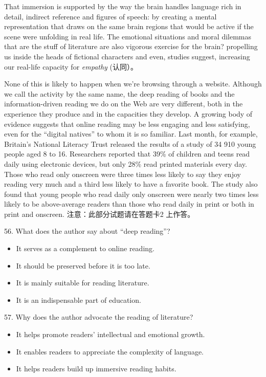 \documentclass[UTF8,11pt]{ctexart}
\begin{document}
That immersion is supported by the way the brain handles language rich in detail, indirect reference and figures of speech: by creating a mental representation that draws on the same brain regions that would be active if the scene were unfolding in real life. The emotional situations and moral dilemmas that are the stuff of literature are also vigorous exercise for the brain? propelling us inside the heads of fictional characters and even, studies suggest, increasing our real-life capacity for\textit{ empathy} (认同）。


None of this is likely to happen when we’re browsing through a website. Although we call the activity by the same name, the deep reading of books and the information-driven reading we do on the Web are very different, both in the experience they produce and in the capacities they develop. A growing body of evidence suggests that online reading may be less engaging and less satisfying, even for the “digital natives” to whom it is so familiar. Last month, for example, Britain’s National Literacy Trust released the results of a study of 34 910 young people aged 8 to 16. Researchers reported that 39\% of children and teens read daily using electronic devices, but only 28\% read printed materials every day. Those who read only onscreen were three times less likely to say they enjoy reading very much and a third less likely to have a favorite book. The study also found that young people who read daily only onscreen were nearly two times less likely to be above-average readers than those who read daily in print or both in print and onscreen. 注意：此部分试题请在答题卡2 上作答。


56. What does the author say about “deep reading”?


\begin{itemize}[leftmargin=2em,itemsep=.2em,topsep=.4em]\item[A.] It serves as a complement to online reading.
\item[B.] It should be preserved before it is too late.
\item[C.] It is mainly suitable for reading literature.
\item[D.] It is an indispensable part of education.
\end{itemize}

57. Why does the author advocate the reading of literature?


\begin{itemize}[leftmargin=2em,itemsep=.2em,topsep=.4em]\item[A.] It helps promote readers’ intellectual and emotional growth.
\item[B.] It enables readers to appreciate the complexity of language.
\item[C.] It helps readers build up immersive reading habits.
\end{itemize}
\end{document}
